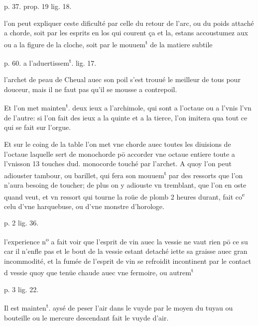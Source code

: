 \documentclass[11pt,a4paper]{article}
\begin{document}
p. 37. prop. 19 lig. 18.

l'on peut expliquer ceste dificulté par celle du retour de l'arc, ou du poids attaché a \ill{} chorde, soit par les esprits en los qui courent ça et la, estans accoustumez aux \ill{} ou a la figure de la cloche, soit par le mouuem\textsuperscript{t} de la matiere subtile

p. 60. a l'aduertissem\textsuperscript{t}. lig. 17.

l'archet de peau de Cheual auec son poil s'est trouué le meilleur de tous pour \ill{} douceur, mais il ne faut pas qu'il se mousse a contrepoil.

Et l'on met mainten\textsuperscript{t}. deux ieux a l'archimole, qui sont a l'octaue ou a l'vnis l'vn de l'autre: si l'on fait des ieux a la quinte et a la tierce, l'on imitera qua\ill{} tout ce qui se fait sur l'orgue.

Et sur le coing de la table l'on met vne chorde auec toutes les diuisions de l'octaue laquelle sert de monochorde pō accorder vne octaue entiere toute a l'vnisson \ill{} 13 touches dud. monocorde touché par l'archet. A quoy l'on peut adiouster \ill{} tambour, ou barillet, qui fera son mouuem\textsuperscript{t} par des ressorts que l'on n'aura \ill{} besoing de toucher; de plus on y adiouste vn tremblant, que l'on en oste quand \ill{} veut, et vn ressort qui tourne la roüe de plomb 2 heures durant, fait co\textsuperscript{e} celu d'vne harquebuse, ou d'vne monstre d'horologe.


p. 2 lig. 36.

l'experience n\textsuperscript{o} a fait voir que l'esprit de vin auec la vessie ne vaut rien pō ce su car il n'enfle pas et le bout de la vessie estant detaché iette sa graisse auec gran incommodité, et la fumée de l'esprit de vin se refroidit incontinent par le contact d vessie quoy que tenüe chaude auec vne fermoire, ou autrem\textsuperscript{t}

p. 3 lig. 22.

Il est mainten\textsuperscript{t}. aysé de peser l'air dans le vuyde par le moyen du tuyau ou bouteille ou le mercure descendant fait le vuyde d'air.
\end{document}
